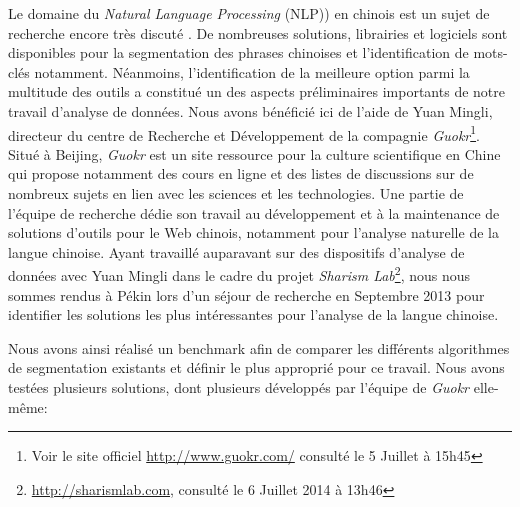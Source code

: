     Le domaine du \textit{Natural Language Processing} (NLP)) en chinois est un sujet de recherche encore très discuté \citep{Qiu2013}. De nombreuses solutions, librairies et logiciels sont disponibles pour la segmentation des phrases chinoises et l'identification de mots-clés notamment. Néanmoins, l{\textquoteright}identification de la meilleure option parmi la multitude des outils a constitué un des aspects préliminaires importants de notre travail d{\textquoteright}analyse de données. Nous avons bénéficié ici de l'aide de Yuan Mingli, directeur du centre de Recherche et Développement de la compagnie \textit{Guokr}\footnote{Voir le site officiel \url{http://www.guokr.com/} consulté le 5 Juillet à 15h45}. Situé à Beijing, \textit{Guokr} est un site ressource pour la culture scientifique en Chine qui propose notamment des cours en ligne et des listes de discussions sur de nombreux sujets en lien avec les sciences et les technologies. Une partie de l'équipe de recherche dédie son travail au développement et à la maintenance de solutions d'outils pour le Web chinois, notamment pour l'analyse naturelle de la langue chinoise. Ayant travaillé auparavant sur des dispositifs d'analyse de données avec Yuan Mingli dans le cadre du projet \textit{Sharism Lab}\footnote{\url{http://sharismlab.com}, consulté le 6 Juillet 2014 à 13h46}, nous nous sommes rendus à Pékin lors d'un séjour de recherche en Septembre 2013 pour identifier les solutions les plus intéressantes pour l'analyse de la langue chinoise.

    Nous avons ainsi réalisé un benchmark afin de comparer les différents algorithmes de segmentation existants et définir le plus approprié pour ce travail. Nous avons testées plusieurs solutions, dont plusieurs développés par l'équipe de \textit{Guokr} elle-même:  

